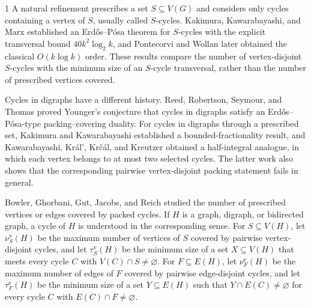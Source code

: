 \documentclass[a4paper,11pt]{article}
\theoremstyle{plain}
\theoremstyle{definition}
\theoremstyle{remark}
\begin{document}
\begin{spacing}{1}
A natural refinement prescribes a set $S\subseteq V(G)$ and considers only
cycles containing a vertex of $S$, usually called $S$-cycles.  Kakimura,
Kawarabayashi, and Marx \cite{KakimuraKawarabayashiMarx2011} established an
Erd\H{o}s--P\'osa theorem for $S$-cycles with the explicit transversal bound
$40k^{2}\log_2 k$, and Pontecorvi and Wollan \cite{PontecorviWollan2012}
later obtained the classical $O(k\log k)$ order.  These results compare the
number of vertex-disjoint $S$-cycles with the minimum size of an $S$-cycle
transversal, rather than the number of prescribed vertices covered.

Cycles in digraphs have a different history.  Reed, Robertson, Seymour, and
Thomas \cite{ReedRobertsonSeymourThomas1996} proved Younger's conjecture that
cycles in digraphs satisfy an Erd\H{o}s--P\'osa-type packing--covering duality.
For cycles in digraphs through a prescribed set, Kakimura and Kawarabayashi
\cite{KakimuraKawarabayashi2012} established a bounded-fractionality result,
and Kawarabayashi, Kr\'al', Kr\v{c}\'al, and Kreutzer
\cite{KawarabayashiKralKrcalKreutzer2013} obtained a half-integral analogue,
in which each vertex belongs to at most two selected cycles.  The latter work
also shows that the corresponding pairwise vertex-disjoint packing statement
fails in general.

Bowler, Ghorbani, Gut, Jacobs, and Reich \cite{BowlerEtAl2026} studied the number of prescribed vertices or edges covered by packed cycles. If $H$ is
a graph, digraph, or bidirected graph, a cycle of $H$ is understood in the
corresponding sense.  For
$S\subseteq V(H)$, let $\nu^{\mathrm v}_S(H)$ be the maximum number of
vertices of $S$ covered by pairwise vertex-disjoint cycles, and let
$\tau^{\mathrm v}_S(H)$ be the minimum size of a set $X\subseteq V(H)$ that
meets every cycle $C$ with $V(C)\cap S\neq\varnothing$.  For
$F\subseteq E(H)$, let $\nu^{\mathrm e}_F(H)$ be the maximum number of edges
of $F$ covered by pairwise edge-disjoint cycles, and let
$\tau^{\mathrm e}_F(H)$ be the minimum size of a set $Y\subseteq E(H)$ such
that $Y\cap E(C)\neq\varnothing$ for every cycle $C$ with
$E(C)\cap F\neq\varnothing$.


\end{spacing}
\end{document}
